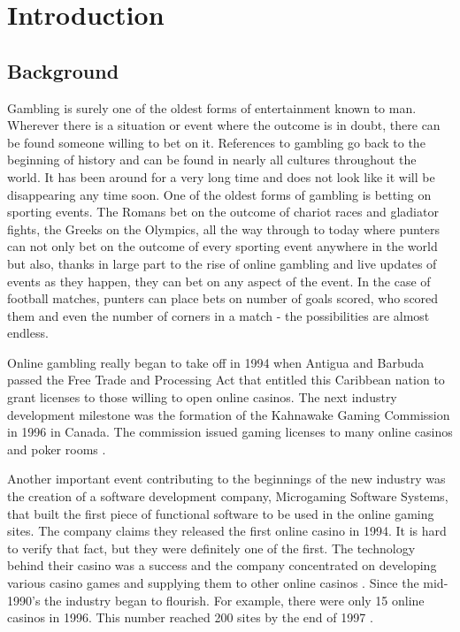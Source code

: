 \chapter{Introduction}
\label{sec:introduction}
\setcounter{page}{1}

\section{Background}
\label{sec:background_intro}
Gambling is surely one of the oldest forms of entertainment known to man. Wherever there is a situation or event where the outcome is in doubt, there can be found someone willing to bet on it. References to gambling go back to the beginning of history and can be found in nearly all cultures throughout the world. It has been around for a very long time and does not look like it will be disappearing any time soon.  One of the oldest forms of gambling is betting on sporting events. The Romans bet on the outcome of chariot races and gladiator fights, the Greeks on the Olympics, all the way through to today where punters can not only bet on the outcome of every sporting event anywhere in the world but also, thanks in large part to the rise of online gambling and live updates of events as they happen, they can bet on any aspect of the event. In the case of football matches, punters can place bets on number of goals scored, who scored them and even the number of corners in a match - the possibilities are almost endless.

Online gambling really began to take off in 1994 when Antigua and Barbuda passed the Free Trade and Processing Act that entitled this Caribbean nation to grant licenses to those willing to open online casinos. The next industry development milestone was the formation of the Kahnawake Gaming Commission in 1996 in Canada. The commission issued gaming licenses to many online casinos and poker rooms \citep{art:historyofonlinegambling}.

Another important event contributing to the beginnings of the new industry was the creation of a software development company, Microgaming Software Systems, that built the first piece of functional software to be used in the online gaming sites. The company claims they released the first online casino in 1994. It is hard to verify that fact, but they were definitely one of the first. The technology behind their casino was a success and the company concentrated on developing various casino games and supplying them to other online casinos \citep{source:gamblingsites} \citep{source:microgaming}. Since the mid-1990's the industry began to flourish. For example, there were only 15 online casinos in 1996. This number reached 200 sites by the end of 1997 \citep{art:historyofonlinegambling}.  

